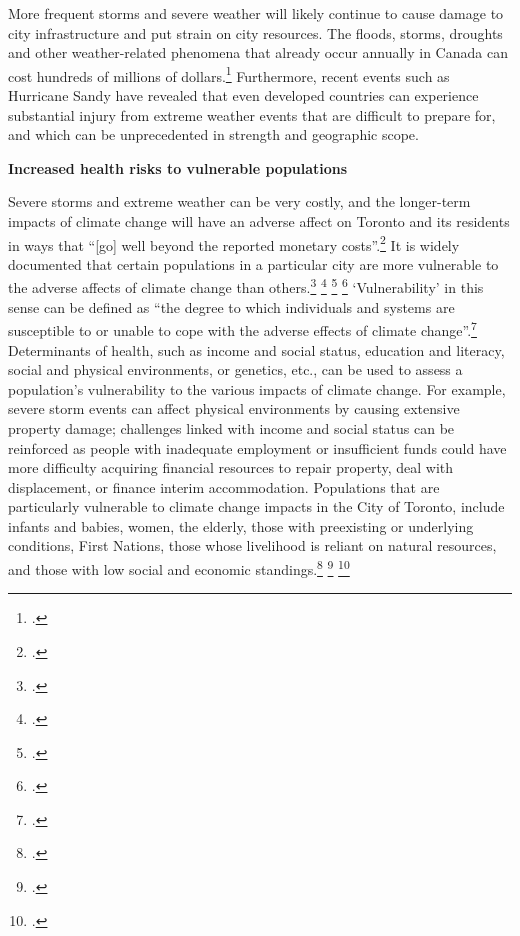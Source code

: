 \documentclass[10pt]{article}
\begin{document}
More frequent storms and severe weather will likely continue to cause damage to city infrastructure and put strain on city resources. 
The floods, storms, droughts and other weather-related phenomena that already occur annually in Canada can cost hundreds of millions of dollars.\footcite[][p. 11]{HHInACC}
Furthermore, recent events such as Hurricane Sandy have revealed that even developed countries can experience substantial injury from extreme weather events that are difficult to prepare for, and which can be unprecedented in strength and geographic scope.   



\textbf{Increased health risks to vulnerable populations}



Severe storms and extreme weather can be very costly, and the longer-term impacts of climate change will have an adverse affect on Toronto and its residents in ways that ``[go] well beyond the reported monetary costs''.\footcite[][p. 19]{CCAHealthEquity}
It is widely documented that certain populations in a particular city are more vulnerable to the adverse affects of climate change than others.\footcite[][]{EbiHealthJustice} \footcite[][]{HotWeatherResponse2006} \footcite[][p. 1153--1163]{MarmotHealthOutcomes} \footcite[][]{ReducingHealthDisparities}
`Vulnerability' in this sense can be defined as ``the degree to which individuals and systems are susceptible to or unable to cope with the adverse effects of climate change''.\footcite[][p. 6]{CCAHealthEquity}
Determinants of health, such as income and social status, education and literacy, social and physical environments, or genetics, etc., can be used to assess a population's vulnerability to the various impacts of climate change. 
For example, severe storm events can affect physical environments by causing extensive property damage; challenges linked with income and social status can be reinforced as people with inadequate employment or insufficient funds could have more difficulty acquiring financial resources to repair property, deal with displacement, or finance interim accommodation. 
Populations that are particularly vulnerable to climate change impacts in the City of Toronto, include infants and babies, women, the elderly, those with preexisting or underlying conditions, First Nations, those whose livelihood is reliant on natural resources, and those with low social and economic standings.\footcite{CCAHealthEquity} \footcite[][]{HHInACC} \footcite[][]{HealthCanadaPreparingImpacts}
\end{document}

